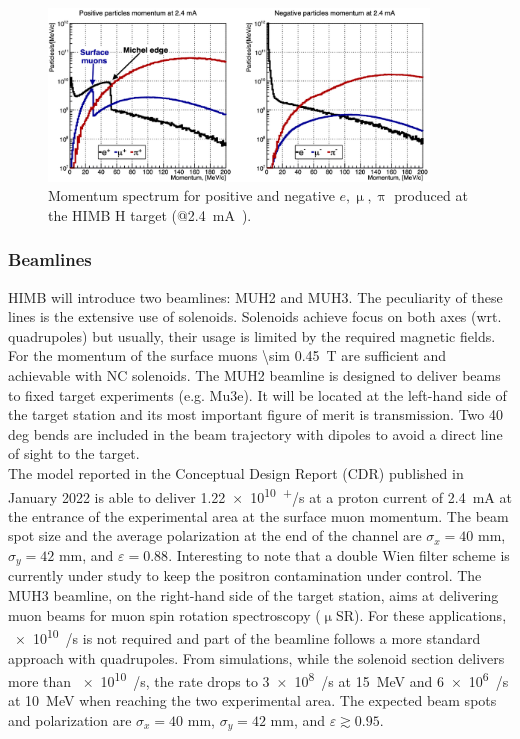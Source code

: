 \begin{refsection}
        \begin{figure}
            \centering
            \includegraphics[width=0.9\textwidth]{Figures/Introduction/himb_momenta.png}
            \caption[HIMB: momentum spectra]{Momentum spectrum for positive and negative $e,\upmu,\uppi$ produced at the HIMB H target (@\SI{2.4}{mA)}.}
            \label{fig:himb:momenta}
        \end{figure}
        
        \subsubsection{Beamlines}
        HIMB will introduce two beamlines: MUH2 and MUH3.
        The peculiarity of these lines is the extensive use of solenoids.
        Solenoids achieve focus on both axes (wrt. quadrupoles) but usually, their usage is limited by the required magnetic fields. 
        For the momentum of the surface muons \SI{\sim 0.45}{T} are sufficient and achievable with NC solenoids. 
        \noindent
        The MUH2 beamline is designed to deliver beams to fixed target experiments (e.g. Mu3e). It will be located at the left-hand side of the target station and its most important figure of merit is transmission.
        Two 40 deg bends are included in the beam trajectory with dipoles to avoid a direct line of sight to the target.\\
        The model reported in the Conceptual Design Report (CDR) published in January 2022  is able to deliver \SI{1.22e10}{\upmu^+/s} at a proton current of \SI{2.4}{mA} at the entrance of the experimental area at the surface muon momentum. 
        The beam spot size and the average polarization at the end of the channel are $\sigma_x = 40$ mm, $\sigma_y = 42$ mm, and $\varepsilon = 0.88$.
        Interesting to note that a double Wien filter scheme is currently under study to keep the positron contamination under control.
        \noindent
        The MUH3 beamline, on the right-hand side of the target station, aims at delivering muon beams for muon spin rotation spectroscopy ($\upmu$SR).
        For these applications, \SI{e10}{\upmu/s} is not required and part of the beamline follows a more standard approach with quadrupoles.
        From simulations, while the solenoid section delivers more than \SI{e10}{\upmu/s}, the rate drops to \SI{3e8}{\upmu/s} at \SI{15}{MeV} and \SI{6e6}{\upmu/s} at \SI{10}{MeV} when reaching the two experimental area.
        The expected beam spots and polarization are $\sigma_x = 40$ mm, $\sigma_y = 42$ mm, and $\varepsilon\gtrsim 0.95$.
        

\end{refsection}

